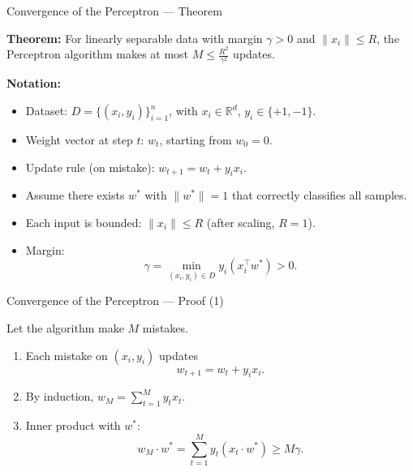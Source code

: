 \documentclass[serif, aspectratio=169]{beamer}
\begin{document}
    \begin{frame}{Convergence of the Perceptron — Theorem}

        \textbf{Theorem:}
        For linearly separable data with margin $\gamma > 0$ and $\|x_i\| \le R$,
        the Perceptron algorithm makes at most $M \le \tfrac{R^2}{\gamma^2}$ updates.

        \vspace{0.8em}

        \textbf{Notation:}


        \begin{itemize}
            \item Dataset: $D = \{(x_i, y_i)\}_{i=1}^n$, with $x_i \in \mathbb{R}^d$, $y_i \in \{+1, -1\}$.
            \item Weight vector at step $t$: $w_t$, starting from $w_0 = 0$.
            \item Update rule (on mistake): $w_{t+1} = w_t + y_i x_i$.
            \item Assume there exists $w^*$ with $\|w^*\| = 1$ that correctly classifies all samples.
            \item Each input is bounded: $\|x_i\| \le R$ (after scaling, $R = 1$).
            \item Margin:
            \[
                \gamma = \min_{(x_i, y_i) \in D} y_i (x_i^\top w^*) > 0.
            \]
        \end{itemize}

    \end{frame}


    \begin{frame}{Convergence of the Perceptron — Proof (1)}

        Let the algorithm make $M$ mistakes.

        \begin{enumerate}
            \item Each mistake on $(x_i, y_i)$ updates
            \[
                w_{t+1} = w_t + y_i x_i.
            \]
            \item By induction, $w_M = \sum_{t=1}^{M} y_t x_t$.
            \item Inner product with $w^*$:
            \[
                w_M \cdot w^* = \sum_{t=1}^{M} y_t (x_t \cdot w^*) \ge M \gamma.
            \]
        \end{enumerate}

    \end{frame}
\end{document}
